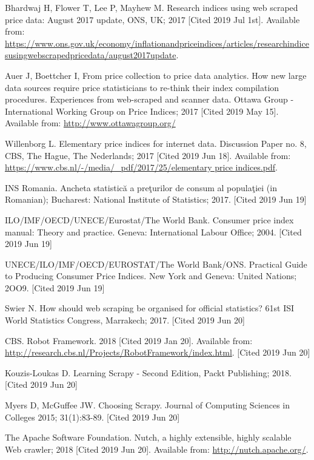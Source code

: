 \documentclass[]{article}
\begin{document}
\begin{thebibliography}{99}
Bhardwaj H, Flower T, Lee P, Mayhew M. Research indices using web scraped price data: August 2017 update, ONS, UK; 2017 [Cited 2019 Jul 1st]. Available from:
\url{https://www.ons.gov.uk/economy/inflationandpriceindices/articles/researchindicesusingwebscrapedpricedata/august2017update}.

Auer J, Boettcher I, From price collection to price data analytics. How new large data sources require price statisticians to re-think their index compilation procedures. Experiences from web-scraped and scanner data.
Ottawa Group - International Working Group on Price Indices; 2017 [Cited 2019 May 15]. Available from: \url{http://www.ottawagroup.org/}

Willenborg L. Elementary price indices for internet data. Discussion Paper no. 8, CBS, The Hague, The Nederlands; 2017 [Cited 2019 Jun 18]. Available from:
\url{https://www.cbs.nl/-/media/_pdf/2017/25/elementary price indices.pdf}.

INS Romania. Ancheta statistică a preţurilor de consum al populaţiei (in Romanian); Bucharest: National Institute of Statistics; 2017. [Cited 2019 Jun 19]

ILO/IMF/OECD/UNECE/Eurostat/The World Bank. Consumer price index manual: Theory and practice. Geneva: International Labour Office; 2004. [Cited 2019 Jun 19]

UNECE/ILO/IMF/OECD/EUROSTAT/The World Bank/ONS. Practical Guide to Producing Consumer Price Indices. New York and Geneva: United Nations; 2OO9. [Cited 2019 Jun 19]

Swier N. How should web scraping be organised for official statistics? 61st ISI World Statistics Congress, Marrakech; 2017. [Cited 2019 Jun 20]

CBS. Robot Framework. 2018 [Cited 2019 Jan 20]. Available from: \url{http://research.cbs.nl/Projects/RobotFramework/index.html}. [Cited 2019 Jun 20]

Kouzis-Loukas D. Learning Scrapy - Second Edition, Packt Publishing; 2018. [Cited 2019 Jun 20]

Myers D, McGuffee JW. Choosing Scrapy. Journal of Computing Sciences in Colleges 2015; 31(1):83-89. [Cited 2019 Jun 20]

The Apache Software Foundation. Nutch, a highly extensible, highly scalable Web crawler; 2018 [Cited 2019 Jun 20]. Available from:
\url{http://nutch.apache.org/}.


\end{thebibliography}
\end{document}

